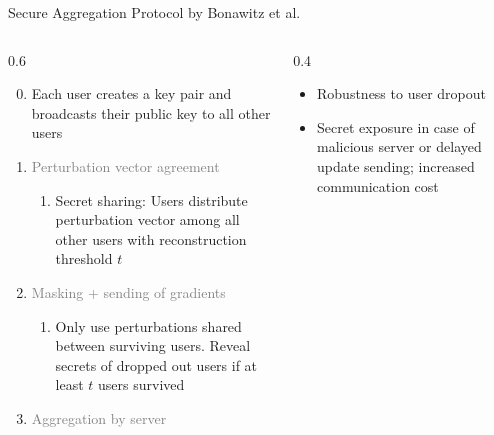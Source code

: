 \documentclass[t,aspectratio=169]{beamer}
\begin{document}
\begin{frame}{Secure Aggregation Protocol by Bonawitz et al. \cite{bonawitz2016practicalsecureaggregationfederated}}
    \begin{columns}
        \begin{column}{0.6\textwidth}
            \begin{enumerate}
            \setcounter{enumi}{-1}
                \item Each user creates a key pair and broadcasts their public key to all other users

                \item \textcolor{gray}{Perturbation vector agreement}
                \begin{enumerate}
                    \item Secret sharing: Users distribute perturbation vector among all other users with reconstruction threshold $t$
                \end{enumerate}
                
                \item \textcolor{gray}{Masking + sending of gradients}
                \begin{enumerate}
                    \item Only use perturbations shared between surviving users. Reveal secrets of dropped out users if at least $t$ users survived
                \end{enumerate}
                
                \item \textcolor{gray}{Aggregation by server
                }
            \end{enumerate}
        \end{column}
        \pause
        \begin{column}{0.4\textwidth}
            \begin{itemize}
                \item[\textbf{\textcolor{green}{+}}] Robustness to user dropout
                \pause
                \item[\textbf{\textcolor{red}{!}}] Secret exposure in case of malicious server or delayed update sending; increased communication cost
            \end{itemize}
        \end{column}
    \end{columns}
\end{frame}
\end{document}
